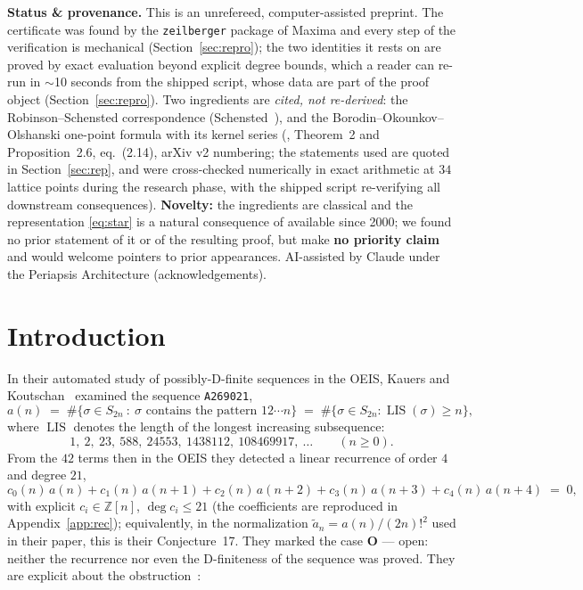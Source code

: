 \documentclass[11pt]{article}
\theoremstyle{plain}
\theoremstyle{definition}
\theoremstyle{remark}
\newcommand{\OEIS}[1]{\texttt{#1}}
\newcommand{\LIS}{\operatorname{LIS}}
\newcommand{\ZZ}{\mathbb{Z}}
\begin{document}
\vspace{4pt}
\noindent\colorbox{black!3}{\parbox{\dimexpr\linewidth-2\fboxsep\relax}{\small
\textbf{Status \& provenance.} This is an unrefereed, computer-assisted preprint. The
certificate was found by the \texttt{zeilberger} package of Maxima and every step of the
verification is mechanical (Section~\ref{sec:repro}); the two identities it rests on are proved
by exact evaluation beyond explicit degree bounds, which a reader can re-run in $\sim$10 seconds
from the shipped script, whose data are part of the proof object (Section~\ref{sec:repro}). Two ingredients are \emph{cited, not re-derived}: the Robinson--Schensted
correspondence (Schensted~\cite{Sch61}), and the Borodin--Okounkov--Olshanski one-point formula
with its kernel series (\cite{BOO00}, Theorem~2 and Proposition~2.6, eq.~(2.14), arXiv v2
numbering; the statements used are quoted in Section~\ref{sec:rep}, and were cross-checked
numerically in exact arithmetic at $34$ lattice points during the research phase, with the
shipped script re-verifying all downstream consequences). \textbf{Novelty:} the ingredients are classical and the representation
\eqref{eq:star} is a natural consequence of \cite{BOO00} available since 2000; we found no prior
statement of it or of the resulting proof, but make \textbf{no priority claim} and would welcome
pointers to prior appearances. AI-assisted by Claude under the Periapsis Architecture
(acknowledgements).}}

\section{Introduction}

In their automated study of possibly-D-finite sequences in the OEIS, Kauers and
Koutschan~\cite{KK23} examined the sequence \OEIS{A269021},
\[
  a(n)\;=\;\#\{\sigma\in S_{2n}\ :\ \sigma\text{ contains the pattern }12\cdots n\}
       \;=\;\#\{\sigma\in S_{2n} : \LIS(\sigma)\ge n\},
\]
where $\LIS$ denotes the length of the longest increasing subsequence:
\[
  1,\ 2,\ 23,\ 588,\ 24553,\ 1438112,\ 108469917,\ \dots\qquad(n\ge 0).
\]
From the $42$ terms then in the OEIS they detected a linear recurrence of order $4$ and degree
$21$,
\begin{equation}\label{eq:Lrec}
  c_0(n)\,a(n)+c_1(n)\,a(n{+}1)+c_2(n)\,a(n{+}2)+c_3(n)\,a(n{+}3)+c_4(n)\,a(n{+}4)\;=\;0,
\end{equation}
with explicit $c_i\in\ZZ[n]$, $\deg c_i\le 21$ (the coefficients are reproduced in
Appendix~\ref{app:rec}); equivalently, in the normalization $\tilde a_n=a(n)/(2n)!^{2}$ used in
their paper, this is their Conjecture~17. They marked the case \textbf{O} --- open: neither the
recurrence nor even the D-finiteness of the sequence was proved. They are explicit about the
obstruction~\cite[\S6]{KK23}:
\end{document}

